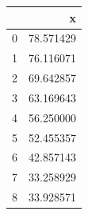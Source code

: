 \begin{tabular}{lr}
\toprule
 & x \\
\midrule
0 & 78.571429 \\
1 & 76.116071 \\
2 & 69.642857 \\
3 & 63.169643 \\
4 & 56.250000 \\
5 & 52.455357 \\
6 & 42.857143 \\
7 & 33.258929 \\
8 & 33.928571 \\
\bottomrule
\end{tabular}
